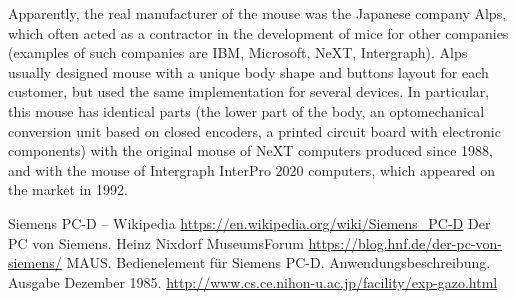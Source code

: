 \documentclass[11pt, a4paper]{article}
\begin{document}
Apparently, the real manufacturer of the mouse was the Japanese company Alps, which often acted as a contractor in the development of mice for other companies (examples of such companies are IBM, Microsoft, NeXT, Intergraph). Alps usually designed mouse with a unique body shape and buttons layout for each customer, but used the same implementation for several devices. In particular, this mouse has identical parts (the lower part of the body, an optomechanical conversion unit based on closed encoders, a printed circuit board with electronic components) with the original mouse of NeXT computers produced since 1988, and with the mouse of Intergraph InterPro 2020 computers, which appeared on the market in 1992.

\begin{thebibliography}{9}
 Siemens PC-D -- Wikipedia \url{https://en.wikipedia.org/wiki/Siemens_PC-D}
 Der PC von Siemens. Heinz Nixdorf MuseumsForum \url{https://blog.hnf.de/der-pc-von-siemens/}
 MAUS. Bedienelement für Siemens PC-D. Anwendungsbeschreibung. Ausgabe Dezember 1985. \url{http://www.cs.ce.nihon-u.ac.jp/facility/exp-gazo.html}
\end{thebibliography}
\end{document}
